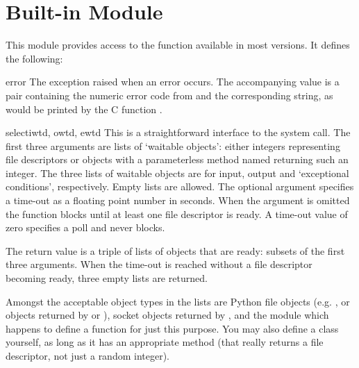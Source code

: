 \section{Built-in Module }
\label{module-select}

This module provides access to the function  available in
most \UNIX{} versions.  It defines the following:

\begin{excdesc}{error}
The exception raised when an error occurs.  The accompanying value is
a pair containing the numeric error code from  and the
corresponding string, as would be printed by the C function
.
\end{excdesc}

\begin{funcdesc}{select}{iwtd, owtd, ewtd}
This is a straightforward interface to the \UNIX{} 
system call.  The first three arguments are lists of `waitable
objects': either integers representing \UNIX{} file descriptors or
objects with a parameterless method named  returning
such an integer.  The three lists of waitable objects are for input,
output and `exceptional conditions', respectively.  Empty lists are
allowed.  The optional  argument specifies a time-out as a
floating point number in seconds.  When the  argument
is omitted the function blocks until at least one file descriptor is
ready.  A time-out value of zero specifies a poll and never blocks.

The return value is a triple of lists of objects that are ready:
subsets of the first three arguments.  When the time-out is reached
without a file descriptor becoming ready, three empty lists are
returned.

Amongst the acceptable object types in the lists are Python file
objects (e.g. , or objects returned by 
or ), socket objects returned by
, and the module  which happens to
define a function  for just this purpose.  You may
also define a  class yourself, as long as it has an
appropriate  method (that really returns a \UNIX{} file
descriptor, not just a random integer).
\end{funcdesc}
